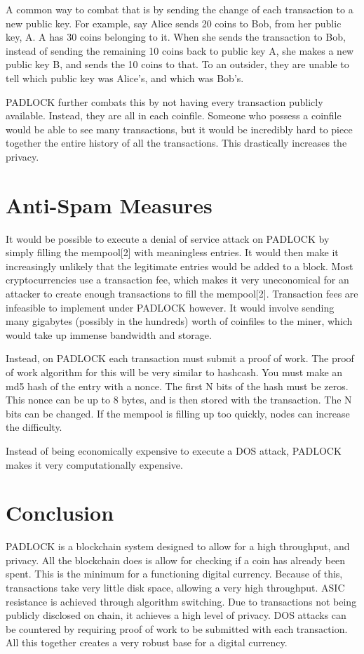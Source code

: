\documentclass[12pt, letterpaper]{article}
\begin{document}
A common way to combat that is by sending the change of each transaction to a new
public key. For example, say Alice sends 20 coins to Bob, from her public key, A.
A has 30 coins belonging to it. When she sends the transaction to Bob, instead
of sending the remaining 10 coins back to public key A, she makes a new public
key B, and sends the 10 coins to that. To an outsider, they are unable to tell
which public key was Alice's, and which was Bob's.

PADLOCK further combats this by not having every transaction publicly available.
Instead, they are all in each coinfile. Someone who possess a coinfile would be
able to see many transactions, but it would be incredibly hard to piece together
the entire history of all the transactions. This drastically increases the
privacy.


\section{Anti-Spam Measures}
It would be possible to execute a denial of service attack on PADLOCK by simply
filling the mempool[2] with
meaningless entries. It would then make it increasingly unlikely that the
legitimate entries would be added to a block. Most cryptocurrencies use a
transaction fee, which makes it very uneconomical for an attacker to create
enough transactions to fill the mempool[2]. Transaction fees are infeasible to
implement under PADLOCK however. It would involve sending many gigabytes
(possibly in the hundreds) worth of coinfiles to the miner, which would take up
immense bandwidth and storage.

Instead, on PADLOCK each transaction must submit a proof of work. The proof of
work algorithm for this will be very similar to hashcash. You must make an md5
hash of the entry with a nonce. The first N bits of the hash must be zeros. This
nonce can be up to 8 bytes, and is then stored with the transaction. The N bits
can be changed. If the mempool is filling up too quickly, nodes can increase the
difficulty.

Instead of being economically expensive to execute a DOS attack, PADLOCK makes
it very computationally expensive.


\section{Conclusion}
PADLOCK is a blockchain system designed to allow for a high throughput, and
privacy. All the blockchain does is allow for checking
if a coin has already been spent. This is the minimum for a functioning
digital currency. Because of this, transactions take very little disk space,
allowing a very high throughput. ASIC resistance is achieved through algorithm
switching. Due to transactions not being publicly disclosed on chain, it
achieves a high level of privacy. DOS attacks can be countered by requiring
proof of work to be submitted with each transaction. All this together creates a very robust base for a digital currency.
\end{document}
